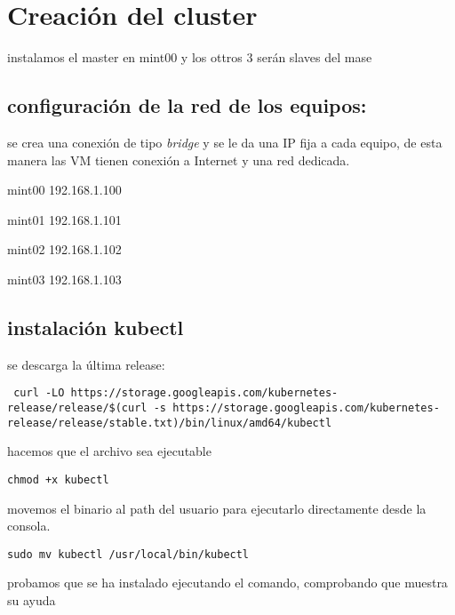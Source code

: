 \documentclass[../main.tex]{subfiles}
\begin{document}
\section{Creación del cluster}
instalamos el master en mint00 y los ottros 3 serán slaves del mase

\subsection{configuración de la red de los equipos:}
se crea una conexión de tipo \textit{bridge }y se le da una IP fija a cada equipo, de esta manera las VM tienen conexión a Internet y una red dedicada.
\begin{list}{·}{}
	\item mint00 192.168.1.100
	\item mint01 192.168.1.101
	\item mint02 192.168.1.102
	\item mint03 192.168.1.103
\end{list}


\subsection{instalación kubectl}
se descarga la última release:

\begin{lstlisting}
 curl -LO https://storage.googleapis.com/kubernetes-release/release/$(curl -s https://storage.googleapis.com/kubernetes-release/release/stable.txt)/bin/linux/amd64/kubectl
\end{lstlisting}
hacemos que el archivo sea ejecutable

\begin{lstlisting}
chmod +x kubectl
\end{lstlisting}
movemos el binario al path del usuario para ejecutarlo directamente desde la consola.

\begin{lstlisting}
sudo mv kubectl /usr/local/bin/kubectl
\end{lstlisting}
 
 probamos que se ha instalado ejecutando el comando, comprobando que muestra su ayuda
\end{document}
